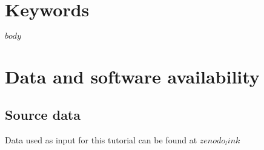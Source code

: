 \maketitle
\thispagestyle{fancy}

\\
\\
\begin{abstract}
$abstract$
\end{abstract}

\section*{\color{f1ROrange}Keywords}


\clearpage
\pagestyle{fancy}

$body$

\section*{Data and software availability} %


\subsection*{Source data}

Data used as input for this tutorial can be found at \href{$zenodo_link$}{$zenodo_link$}

